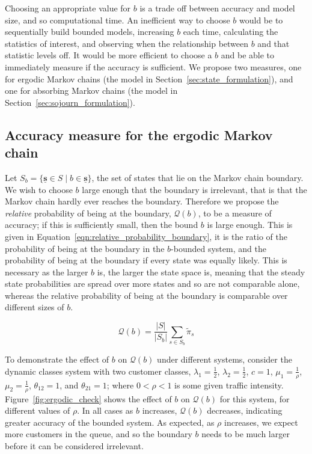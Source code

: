\documentclass{article}
\begin{document}
Choosing an appropriate value for $b$ is a trade off between accuracy and model
size, and so computational time. An inefficient way to choose $b$ would be to
sequentially build bounded models, increasing $b$ each time, calculating the
statistics of interest, and observing when the relationship between $b$ and that
statistic levels off.
It would be more efficient to choose a $b$ and be able to immediately measure if
the accuracy is sufficient. We propose two measures, one for ergodic Markov
chains (the model in Section~\ref{sec:state_formulation}), and one for absorbing
Markov chains (the model in Section~\ref{sec:sojourn_formulation}).


\subsection{Accuracy measure for the ergodic Markov chain}\label{sec:ergodic_check}
Let $S_b = \{\underline{\mathbf{s}} \in S \;|\; b \in \underline{\mathbf{s}}\}$,
the set of states that lie on the Markov chain boundary. We wish to choose $b$
large enough that the boundary is irrelevant, that is that the Markov chain
hardly ever reaches the boundary. Therefore we propose the \textit{relative}
probability of being at the boundary, $\mathcal{Q}(b)$, to be a measure of
accuracy; if this is sufficiently small, then the bound $b$ is large enough.
This is given in Equation~\ref{eqn:relative_probability_boundary}, it is the
ratio of the probability of being at the boundary in the $b$-bounded system, and
the probability of being at the boundary if every state was equally likely. This
is necessary as the larger $b$ is, the larger the state space is, meaning that
the steady state probabilities are spread over more states and so are not
comparable alone, whereas the relative probability of being at the boundary is
comparable over different sizes of $b$.

\begin{equation}\label{eqn:relative_probability_boundary}
\mathcal{Q}(b) = \frac{|S|}{|S_b|} \sum_{s \in S_b} \tilde{\pi}_s
\end{equation}

To demonstrate the effect of $b$ on $\mathcal{Q}(b)$ under different systems,
consider the dynamic classes system with two customer classes,
$\lambda_1 = \frac{1}{2}$, $\lambda_2 = \frac{1}{2}$, $c = 1$,
$\mu_1 = \frac{1}{\rho}$, $\mu_2 = \frac{1}{\rho}$, $\theta_{12} = 1$, and
$\theta_{21} = 1$; where $0 < \rho < 1$ is some given traffic intensity.
Figure~\ref{fig:ergodic_check} shows the effect of $b$ on $\mathcal{Q}(b)$ for
this system, for different values of $\rho$. In all cases as $b$ increases,
$\mathcal{Q}(b)$ decreases, indicating greater accuracy of the bounded system.
As expected, as $\rho$ increases, we expect more customers in the queue, and so
the boundary $b$ needs to be much larger before it can be considered irrelevant.
\end{document}

